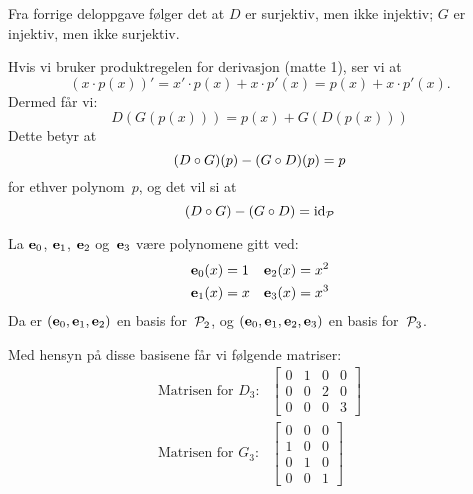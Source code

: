 \begin{losning}
\begin{punkt}
\noindent
Fra forrige deloppgave følger det at $D$ er surjektiv, men ikke injektiv; $G$ er injektiv, men ikke surjektiv.
\end{punkt}

\begin{punkt}
Hvis vi bruker produktregelen for derivasjon (matte 1), ser vi at 
$$(x\cdot p(x))'=x'\cdot p(x)+x\cdot p'(x)=p(x)+x\cdot p'(x).$$
Dermed får vi:
\[
D(G(p(x)))=p(x)+G(D(p(x)))
\]
Dette betyr at
\[
(D \fcomp G)(p) - (G \fcomp D)(p) = p
\]
for ethver polynom~$p$, og det vil si at
\[
(D \fcomp G) - (G \fcomp D) = \id_{\P}
\]
\end{punkt}

\begin{punkt}
La $\e_0$, $\e_1$, $\e_2$ og~$\e_3$ være polynomene gitt ved:
\begin{align*}
\e_0(x) &= 1 &
\e_2(x) &= x^2 \\
\e_1(x) &= x &
\e_3(x) &= x^3
\end{align*}
Da er $(\e_0, \e_1, \e_2)$ en basis for~$\P_2$, og
$(\e_0, \e_1, \e_2, \e_3)$ en basis for~$\P_3$.

Med hensyn på disse basisene får vi følgende matriser:
\begin{align*}
\text{Matrisen for~$D_3$:} &
\begin{bmatrix}
0 & 1 & 0 & 0 \\
0 & 0 & 2 & 0 \\
0 & 0 & 0 & 3
\end{bmatrix}
\\
\text{Matrisen for~$G_3$:} &
\begin{bmatrix}
0 & 0 & 0 \\
1 & 0 & 0 \\
0 & 1 & 0 \\
0 & 0 & 1
\end{bmatrix}
\end{align*}



\end{punkt}
\end{losning}
